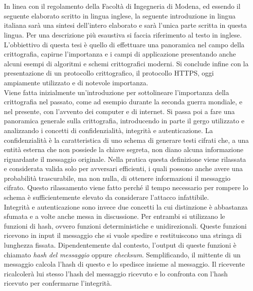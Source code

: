 \chapter*{}
In linea con il regolamento della Facoltà di Ingegneria di Modena, ed essendo il seguente elaborato scritto in lingua inglese, la seguente introduzione in lingua italiana sarà una sintesi dell'intero elaborato e sarà l'unica parte scritta in questa lingua. Per una descrizione più esaustiva si faccia riferimento al testo in inglese.\\
L'obbiettivo di questa tesi è quello di effettuare una panoramica nel campo della crittografia, capirne l'importanza e i campi di applicazione presentando anche alcuni esempi di algoritmi e schemi crittografici moderni. Si conclude infine con la presentazione di un protocollo crittografico, il protocollo HTTPS, oggi ampiamente utilizzato e di notevole importanza.
\\
Viene fatta inizialmente un'introduzione per sottolineare l'importanza della crittografia nel passato, come ad esempio durante la seconda guerra mondiale, e nel presente, con l'avvento dei computer e di internet. Si passa poi a fare una panoramica generale sulla crittografia, introducendo in parte il gergo utilizzato e analizzando i concetti di confidenzialità, integrità e autenticazione. La confidenzialità è la caratteristica di uno schema di generare testi cifrati che, a una entità esterna che non possiede la chiave segreta, non diano alcuna informazione riguardante il messaggio originale. Nella pratica questa definizione viene rilassata e considerata valida solo per avversari efficienti, i quali possono anche avere una probabilità trascurabile, ma non nulla, di ottenere informazioni il messaggio cifrato. Questo rilassamento viene fatto perché il tempo necessario per rompere lo schema è sufficientemente elevato da considerare l'attacco infattibile.\\
 Integrità e autenticazione sono invece due concetti la cui distinzione è abbastanza sfumata e a volte anche messa in discussione. Per entrambi si utilizzano le funzioni di hash, ovvero funzioni deterministiche e unidirezionali. Queste funzioni ricevono in input il messaggio che si vuole spedire e restituiscono una stringa di lunghezza fissata. Dipendentemente dal contesto, l'output di queste funzioni è chiamato \emph{hash del messaggio} oppure \emph{checksum}. Semplificando, il mittente di un messaggio calcola l'hash di questo e lo spedisce insieme al messaggio. Il ricevente ricalcolerà lui stesso l'hash del messaggio ricevuto e lo confronta con l'hash ricevuto per confermarne l'integrità.
